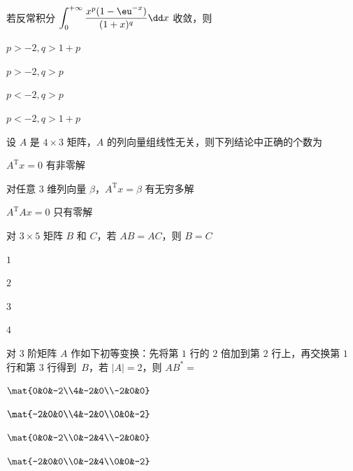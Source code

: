 \begin{question}[index=4]
若反常积分 $\displaystyle\int_0^{+\infty}\frac{x^p(1-\eu^{-x})}{(1+x)^q}\dd x$ 收敛，则
\begin{choices}[columns=2]
\item $p>-2,q>1+p$
\item $p>-2,q>p$
\item $p<-2,q>p$
\item $p<-2,q>1+p$
\end{choices}
\end{question}
\QuestionBreak

\begin{question}[index=5]
设 $A$ 是 $4\times3$ 矩阵，$A$ 的列向量组线性无关，则下列结论中正确的个数为
\par{}\quad $A^{\mathrm T}x=0$ 有非零解
\par{}\quad 对任意 $3$ 维列向量 $\beta$，$A^{\mathrm T}x=\beta$ 有无穷多解
\par{}\quad $A^{\mathrm T}Ax=0$ 只有零解
\par{}\quad 对 $3\times5$ 矩阵 $B$ 和 $C$，若 $AB=AC$，则 $B=C$
\begin{choices}[columns=4]
\item $1$
\item $2$
\item $3$
\item $4$
\end{choices}
\end{question}
\QuestionBreak

\begin{question}[index=6]
对 $3$ 阶矩阵 $A$ 作如下初等变换：先将第 $1$ 行的 $2$ 倍加到第 $2$ 行上，再交换第 $1$ 行和第 $3$ 行\allowbreak\mbox{得到 $B$}，若 $|A|=2$，则 $AB^*=$
\begin{choices}[columns=2]
\item $\mat{0&0&-2\\4&-2&0\\-2&0&0}$
\item $\mat{-2&0&0\\4&-2&0\\0&0&-2}$
\item $\mat{0&0&-2\\0&-2&4\\-2&0&0}$
\item $\mat{-2&0&0\\0&-2&4\\0&0&-2}$
\end{choices}
\end{question}
\QuestionBreak

